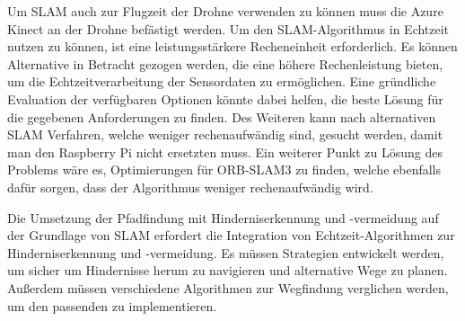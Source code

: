Um SLAM auch zur Flugzeit der Drohne verwenden zu können muss die Azure Kinect an der Drohne befästigt werden.
Um den SLAM-Algorithmus in Echtzeit nutzen zu können, ist eine leistungsstärkere Recheneinheit erforderlich. Es können Alternative in Betracht gezogen werden, die eine höhere Rechenleistung bieten, um die Echtzeitverarbeitung der Sensordaten zu ermöglichen. Eine gründliche Evaluation der verfügbaren Optionen könnte dabei helfen, die beste Lösung für die gegebenen Anforderungen zu finden. Des Weiteren kann nach alternativen SLAM Verfahren, welche weniger rechenaufwändig sind, gesucht werden, damit man den Raspberry Pi nicht ersetzten muss. Ein weiterer Punkt zu Lösung des Problems wäre es, Optimierungen für ORB-SLAM3 zu finden, welche ebenfalls dafür sorgen, dass der Algorithmus weniger rechenaufwändig wird. 

Die Umsetzung der Pfadfindung mit Hinderniserkennung und -vermeidung auf der Grundlage von SLAM erfordert die Integration von Echtzeit-Algorithmen zur Hinderniserkennung und -vermeidung. Es müssen Strategien entwickelt werden, um sicher um Hindernisse herum zu navigieren und alternative Wege zu planen. Außerdem müssen verschiedene Algorithmen zur Wegfindung verglichen werden, um den passenden zu implementieren.
